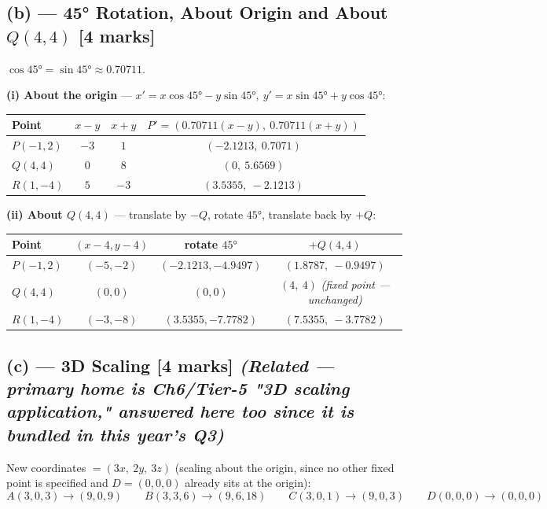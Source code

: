 \documentclass[12pt, a4paper]{article}
\newenvironment{solutionbox}{\begin{mdframed}[style=solutionframe]}{\end{mdframed}}
\newenvironment{answerbox}{\begin{mdframed}[style=answerframe]}{\end{mdframed}}
\begin{document}
\subsection*{(b) --- 45° Rotation, About Origin and About $Q(4,4)$ [4 marks]}
$\cos45°=\sin45°\approx0.70711$.
\begin{solutionbox}
\textbf{(i) About the origin} --- $x'=x\cos45°-y\sin45°,\ y'=x\sin45°+y\cos45°$:
\begin{center}
\begin{tabular}{lccc}
\toprule
Point & $x-y$ & $x+y$ & $P'=(0.70711(x-y),\ 0.70711(x+y))$ \\
\midrule
$P(-1,2)$ & $-3$ & $1$ & $(-2.1213,\ 0.7071)$ \\
$Q(4,4)$ & $0$ & $8$ & $(0,\ 5.6569)$ \\
$R(1,-4)$ & $5$ & $-3$ & $(3.5355,\ -2.1213)$ \\
\bottomrule
\end{tabular}
\end{center}
\end{solutionbox}
\begin{solutionbox}
\textbf{(ii) About $Q(4,4)$} --- translate by $-Q$, rotate $45°$, translate back by $+Q$:
\begin{center}
\begin{tabular}{lccc}
\toprule
Point & $(x-4,y-4)$ & rotate $45°$ & $+Q(4,4)$ \\
\midrule
$P(-1,2)$ & $(-5,-2)$ & $(-2.1213,-4.9497)$ & $(1.8787,\ -0.9497)$ \\
$Q(4,4)$ & $(0,0)$ & $(0,0)$ & $(4,\ 4)$ \emph{(fixed point --- unchanged)} \\
$R(1,-4)$ & $(-3,-8)$ & $(3.5355,-7.7782)$ & $(7.5355,\ -3.7782)$ \\
\bottomrule
\end{tabular}
\end{center}
\end{solutionbox}

\subsection*{(c) --- 3D Scaling [4 marks] \emph{(Related --- primary home is Ch6/Tier-5 "3D scaling application," answered here too since it is bundled in this year's Q3)}}
\begin{answerbox}
New coordinates $=(3x,\ 2y,\ 3z)$ (scaling about the origin, since no other fixed point is specified and $D=(0,0,0)$ already sits at the origin):
$$A(3,0,3)\to(9,0,9) \qquad B(3,3,6)\to(9,6,18) \qquad C(3,0,1)\to(9,0,3) \qquad D(0,0,0)\to(0,0,0)$$
\end{answerbox}
\end{document}
